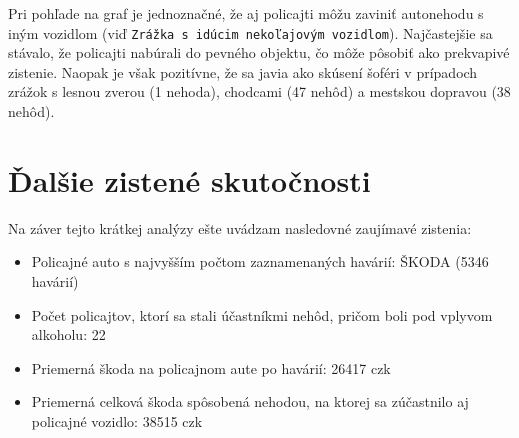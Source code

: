 \documentclass{article}
\begin{document}
Pri pohľade na graf je jednoznačné, že aj policajti môžu zaviniť autonehodu s iným vozidlom
(viď \texttt{Zrážka s idúcim nekoľajovým vozidlom}).
Najčastejšie sa stávalo, že policajti nabúrali do pevného objektu, čo môže pôsobiť ako prekvapivé zistenie.
Naopak je však pozitívne, že sa javia ako skúsení šoféri v prípadoch zrážok s lesnou zverou (1 nehoda),
chodcami (47 nehôd) a mestskou dopravou (38 nehôd).



\section{Ďalšie zistené skutočnosti}\label{sec:dalsie-postrehnute-skutocnosti}

Na záver tejto krátkej analýzy ešte uvádzam nasledovné zaujímavé zistenia:

\begin{itemize}
 \item Policajné auto s najvyšším počtom zaznamenaných havárií: ŠKODA (5346 havárií)
 \item Počet policajtov, ktorí sa stali účastníkmi nehôd, pričom boli pod vplyvom alkoholu: 22
 \item Priemerná škoda na policajnom aute po havárií: 26417 czk
 \item Priemerná celková škoda spôsobená nehodou, na ktorej sa zúčastnilo aj policajné vozidlo: 38515 czk
\end{itemize}
\end{document}
